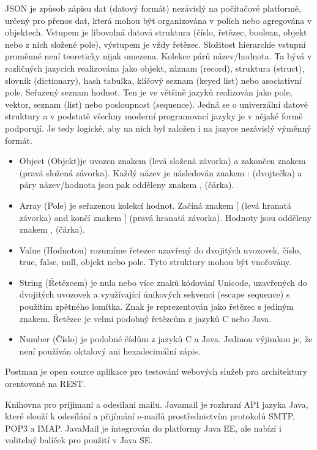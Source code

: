 JSON je způsob zápisu dat (datový formát) nezávislý na počítačové platformě, určený pro přenos dat, která mohou být organizována v polích nebo agregována v objektech. Vstupem je libovolná datová struktura (číslo, řetězec, boolean, objekt nebo z nich složené pole), výstupem je vždy řetězec. Složitost hierarchie vstupní proměnné není teoreticky nijak omezena. Kolekce párů název/hodnota. Ta bývá v rozličných jazycích realizována jako objekt, záznam (record), struktura (struct), slovník (dictionary), hash tabulka, klíčový seznam (keyed list) nebo asociativní pole. Seřazený seznam hodnot. Ten je ve většině jazyků realizován jako pole, vektor, seznam (list) nebo posloupnost (sequence).
Jedná se o univerzální datové struktury a v podstatě všechny moderní programovací jazyky je v nějaké formě podporují. Je tedy logické, aby na nich byl založen i na jazyce nezávislý výměnný formát.
\begin{itemize}
	\item Object (Objekt)je uvozen znakem { (levá složená závorka) a zakončen znakem } (pravá složená závorka). Každý název je následován znakem : (dvojtečka) a páry název/hodnota jsou pak odděleny znakem , (čárka).
	\item Array (Pole) je seřazenou kolekcí hodnot. Začíná znakem [ (levá hranatá závorka) and končí znakem ] (pravá hranatá závorka). Hodnoty jsou odděleny znakem , (čárka).
	\item Value (Hodnotou) rozumíme řetezec uzavřený do dvojitých uvozovek, číslo, true, false, null, objekt nebo pole.
	Tyto struktury mohou být vnořovány.
	\item String (Řetězcem) je nula nebo více znaků kódování Unicode, uzavřených do dvojitých uvozovek a využívající únikových sekvencí (escape sequence) s použitím zpětného lomítka. Znak je reprezentován jako řetězec s jediným znakem. Řetězec je velmi podobný řetězcům z jazyků C nebo Java.
	\item Number (Číslo) je podobné číslům z jazyků C a Java. Jedinou výjimkou je, že není používán oktalový ani hexadecimální zápis.
\end{itemize}

Postman je open source aplikace pro testování webových služeb pro architektury orentované na REST.

Knihovna pro prijimani a odesilani mailu. Javamail je rozhraní API jazyka Java, které slouží k odesílání a přijímání e-mailů prostřednictvím protokolů SMTP, POP3 a IMAP. JavaMail je integrován do platformy Java EE, ale nabízí i volitelný balíček pro použití v Java SE.

